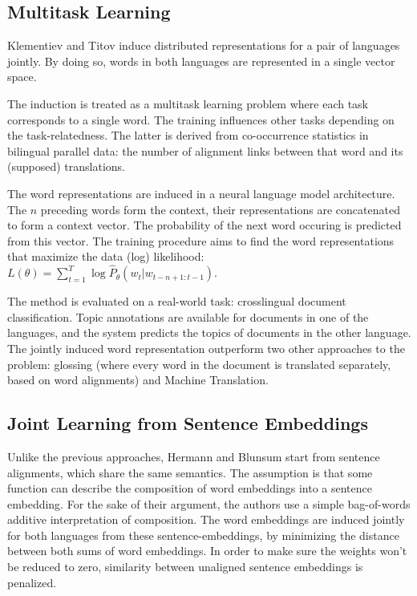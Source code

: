 \subsection{Multitask Learning}

Klementiev and Titov \cite{klementiev2012inducing} induce distributed representations for a pair of languages jointly. By doing so, words in both languages are represented in a single vector space.

The induction is treated as a multitask learning problem where each task corresponds to a single word. The training influences other tasks depending on the task-relatedness. The latter is derived from co-occurrence statistics in bilingual parallel data: the number of alignment links between  that word and its (supposed) translations. 

The word representations are induced in a neural language model architecture. 
The $n$ preceding words form the context, their representations are concatenated to form a context vector. The probability of the next word occuring is predicted from this vector. The training procedure aims to find the word representations that maximize the data (log) likelihood: 
$L(\theta) = \sum_{t=1}^T \log \hat{P}_\theta (w_t|w_{t-n+1:t-1})$. 

The method is evaluated on a real-world task: crosslingual document classification. Topic annotations are available for documents in one of the languages, and the system predicts the topics of documents in the other language. The jointly induced word representation outperform two other approaches to the problem: glossing (where every word in the document is translated separately, based on word alignments) and Machine Translation.


\subsection{Joint Learning from Sentence Embeddings}

Unlike the previous approaches, Hermann and Blunsum \cite{hermann2013multilingual} start from sentence alignments, which share the same semantics.
The assumption is that some function can describe the composition of word embeddings into a sentence embedding.
For the sake of their argument, the authors use a simple bag-of-words additive interpretation of composition. 
The word embeddings are induced jointly for both languages from these sentence-embeddings, by minimizing the distance between both sums of word embeddings.
In order to make sure the weights won't be reduced to zero, similarity between unaligned sentence embeddings is penalized.

